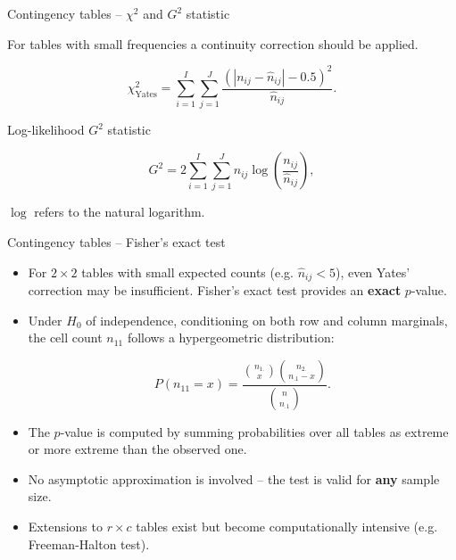 \documentclass[10pt,ignorenonframetext,aspectratio=169]{beamer}
\begin{document}
\begin{frame}{Contingency tables -- $\chi^2$ and $G^2$ statistic}

For tables with small frequencies a continuity correction should be applied.

\begin{equation}
    \chi_{\mathrm{Yates}}^{2}=\sum_{i=1}^{I}\sum_{j=1}^J \frac{\left(\left|n_{ij}-\hat{n}_{ij}\right|-0.5\right)^{2}}{\hat{n}_{ij}}.
\end{equation}

Log-likelihood $G^2$ statistic

\begin{equation}
    G^{2}=2 \sum_{i=1}^{I} \sum_{j=1}^{J} n_{i j} \log \left(\frac{n_{i j}}{\hat{n}_{i j}}\right),
\end{equation}

\noindent $\log$ refers to the natural logarithm.
\end{frame}

\begin{frame}{Contingency tables -- Fisher's exact test}

\begin{itemize}
    \item For $2 \times 2$ tables with small expected counts (e.g. $\hat{n}_{ij} < 5$), even Yates' correction may be insufficient. Fisher's exact test provides an \textbf{exact} $p$-value.

    \item Under $H_0$ of independence, conditioning on both row and column marginals, the cell count $n_{11}$ follows a hypergeometric distribution:

\begin{equation}
    P(n_{11} = x) = \frac{\binom{n_{1.}}{x}\binom{n_{2.}}{n_{.1}-x}}{\binom{n}{n_{.1}}}.
\end{equation}

    \item The $p$-value is computed by summing probabilities over all tables as extreme or more extreme than the observed one.

    \item No asymptotic approximation is involved -- the test is valid for \textbf{any} sample size.

    \item Extensions to $r \times c$ tables exist but become computationally intensive (e.g. Freeman-Halton test).
\end{itemize}

\end{frame}
\end{document}
